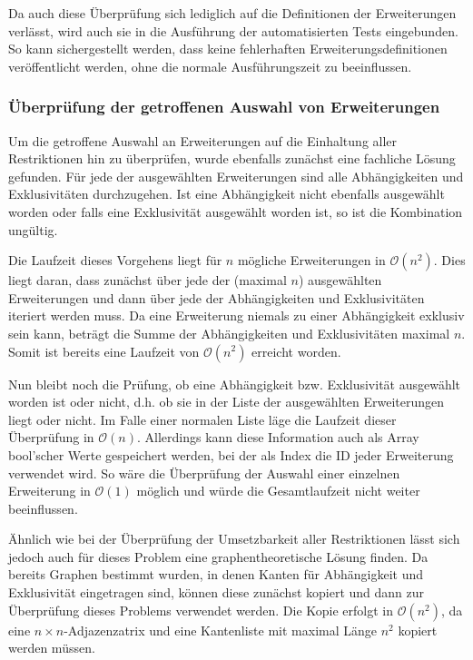 Da auch diese Überprüfung sich lediglich auf die Definitionen der Erweiterungen verlässt, wird auch sie in die Ausführung der automatisierten Tests eingebunden. So kann sichergestellt werden, dass keine fehlerhaften Erweiterungsdefinitionen veröffentlicht werden, ohne die normale Ausführungszeit zu beeinflussen.

\subsubsection{Überprüfung der getroffenen Auswahl von Erweiterungen}
\label{impl:verify_chosen_extensions}
Um die getroffene Auswahl an Erweiterungen auf die Einhaltung aller Restriktionen hin zu überprüfen, wurde ebenfalls zunächst eine fachliche Lösung gefunden. Für jede der ausgewählten Erweiterungen sind alle Abhängigkeiten und Exklusivitäten durchzugehen. Ist eine Abhängigkeit nicht ebenfalls ausgewählt worden oder falls eine Exklusivität ausgewählt worden ist, so ist die Kombination ungültig.

Die Laufzeit dieses Vorgehens liegt für $n$ mögliche Erweiterungen in $\mathcal{O}(n^2)$. Dies liegt daran, dass zunächst über jede der (maximal $n$) ausgewählten Erweiterungen und dann über jede der Abhängigkeiten und Exklusivitäten iteriert werden muss. Da eine Erweiterung niemals zu einer Abhängigkeit exklusiv sein kann, beträgt die Summe der Abhängigkeiten und Exklusivitäten maximal $n$. Somit ist bereits eine Laufzeit von $\mathcal{O}(n^2)$ erreicht worden.

Nun bleibt noch die Prüfung, ob eine Abhängigkeit bzw. Exklusivität ausgewählt worden ist oder nicht, d.h. ob sie in der Liste der ausgewählten Erweiterungen liegt oder nicht. Im Falle einer normalen Liste läge die Laufzeit dieser Überprüfung in $\mathcal{O}(n)$. Allerdings kann diese Information auch als Array bool'scher Werte gespeichert werden, bei der als Index die ID jeder Erweiterung verwendet wird. So wäre die Überprüfung der Auswahl einer einzelnen Erweiterung in $\mathcal{O}(1)$ möglich und würde die Gesamtlaufzeit nicht weiter beeinflussen.

Ähnlich wie bei der Überprüfung der Umsetzbarkeit aller Restriktionen lässt sich jedoch auch für dieses Problem eine graphentheoretische Lösung finden. Da bereits Graphen bestimmt wurden, in denen Kanten für Abhängigkeit und Exklusivität eingetragen sind, können diese zunächst kopiert und dann zur Überprüfung dieses Problems verwendet werden. Die Kopie erfolgt in $\mathcal{O}(n^2)$, da eine $n \times n$-Adjazenzatrix und eine Kantenliste mit maximal Länge $n^2$ kopiert werden müssen.

